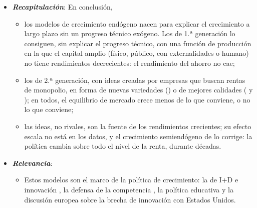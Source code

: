 \documentclass[11pt]{article}
\begin{document}
\begin{itemize}
\item \textbf{\emph{Recapitulación}}: En conclusión,
  \begin{itemize}
  \item los modelos de crecimiento endógeno nacen para explicar el crecimiento a largo plazo sin un progreso técnico exógeno. Los de 1.ª generación lo consiguen, sin explicar el progreso técnico, con una función de producción en la que el capital amplio (físico, público, con externalidades o humano) no tiene rendimientos decrecientes: el rendimiento del ahorro no cae;
  \item los de 2.ª generación, con ideas creadas por empresas que buscan rentas de monopolio, en forma de nuevas variedades () o de mejores calidades ( y ); en todos, el equilibrio de mercado crece menos de lo que conviene, o no lo que conviene;
  \item las ideas, no rivales, son la fuente de los rendimientos crecientes; su efecto escala no está en los datos, y el crecimiento semiendógeno de  lo corrige: la política cambia sobre todo el nivel de la renta, durante décadas.
  \end{itemize}
\item \textbf{\emph{Relevancia}}:
  \begin{itemize}
  \item Estos modelos son el marco de la política de crecimiento: la de I+D e innovación , la defensa de la competencia , la política educativa y la discusión europea sobre la brecha de innovación con Estados Unidos.


\end{itemize}
\end{itemize}
\end{document}

